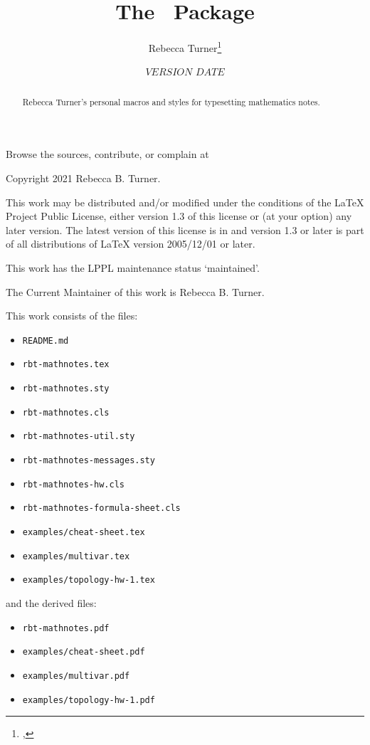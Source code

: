 \documentclass{ltxguidex}
\author{Rebecca Turner\thanks{\email{rbt@sent.as}, \https{becca.ooo}}}
\title{The \mn\ Package}
\date{${VERSION}$ ${DATE}$}
\begin{document}
\maketitle

\begin{abstract}
  Rebecca Turner's personal macros and styles for typesetting mathematics
  notes.
\end{abstract}

\begin{note}
  Browse the sources, contribute, or complain at \\
\end{note}

\tableofcontents
\vfill
\pagebreak

\begin{note}
  Copyright 2021 Rebecca B. Turner.

  This work may be distributed and/or modified under the
  conditions of the LaTeX Project Public License, either version 1.3
  of this license or (at your option) any later version.
  The latest version of this license is in
  and version 1.3 or later is part of all distributions of LaTeX
  version 2005/12/01 or later.

  This work has the LPPL maintenance status `maintained'.

  The Current Maintainer of this work is Rebecca B. Turner.

  This work consists of the files:
    \begin{itemize}
      \item \texttt{README.md}
      \item \texttt{rbt-mathnotes.tex}
      \item \texttt{rbt-mathnotes.sty}
      \item \texttt{rbt-mathnotes.cls}
      \item \texttt{rbt-mathnotes-util.sty}
      \item \texttt{rbt-mathnotes-messages.sty}
      \item \texttt{rbt-mathnotes-hw.cls}
      \item \texttt{rbt-mathnotes-formula-sheet.cls}
      \item \texttt{examples/cheat-sheet.tex}
      \item \texttt{examples/multivar.tex}
      \item \texttt{examples/topology-hw-1.tex}
    \end{itemize}
  and the derived files:
    \begin{itemize}
      \item \texttt{rbt-mathnotes.pdf}
      \item \texttt{examples/cheat-sheet.pdf}
      \item \texttt{examples/multivar.pdf}
      \item \texttt{examples/topology-hw-1.pdf}
    \end{itemize}
\end{note}
\end{document}
